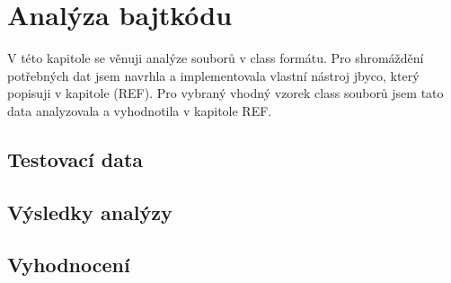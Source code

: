 \chapter{Analýza bajtkódu}\label{Analysis}


V této kapitole se věnuji analýze souborů v class formátu. Pro shromáždění potřebných dat jsem navrhla a implementovala vlastní nástroj jbyco, který popisuji v kapitole (REF). Pro vybraný vhodný vzorek class souborů jsem tato data analyzovala a vyhodnotila v kapitole REF.

\section{Testovací data}\label{AnalysisData}


\section{Výsledky analýzy}\label{AnalysisResults}


\section{Vyhodnocení}\label{AnalysisSummary}



